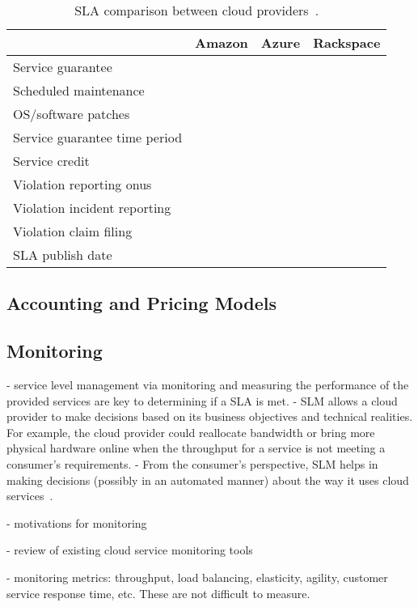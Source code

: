 \begin{table}[htb]\centering \footnotesize
\caption{SLA comparison between cloud providers~\cite{Bas12}.}
\label{tab:sla-comparison}
  \begin{tabular}{lccc}
    \toprule
    & Amazon & Azure & Rackspace \\
    \midrule
    Service guarantee &&& \\
    Scheduled maintenance &&& \\
    OS/software patches &&& \\
    Service guarantee time period &&& \\
    Service credit &&& \\
    Violation reporting onus &&& \\
    Violation incident reporting &&& \\
    Violation claim filing &&& \\
    SLA publish date &&& \\
   \bottomrule
  \end{tabular}
\end{table}


\subsection{Accounting and Pricing Models} \label{sect:accounting}


\subsection{Monitoring} \label{sect:sla-monitoring}

- service level management via monitoring and measuring the performance of the provided services are key to determining if a SLA is met.
- SLM allows a cloud provider to make decisions based on its business objectives and technical realities. For example, the cloud provider could reallocate bandwidth or bring more physical hardware online when the throughput for a service is not meeting a consumer's requirements.
- From the consumer's perspective, SLM helps in making decisions (possibly in an automated manner) about the way it uses cloud services~\cite{Ahr+10}.


- motivations for monitoring~\cite{DLN12,EFN+12}

- review of existing cloud service monitoring tools~\cite{ABD+13,FEH+14}

- monitoring metrics: throughput, load balancing, elasticity, agility, customer service response time, etc. These are not difficult to measure.

